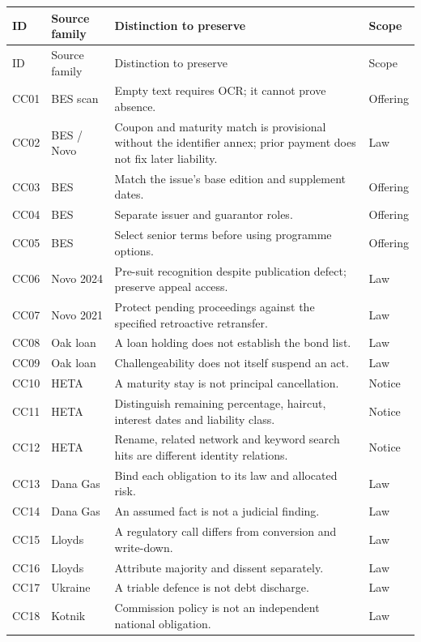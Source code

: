 {\small
\begin{longtable}{P{0.07\textwidth}P{0.18\textwidth}P{0.50\textwidth}P{0.10\textwidth}}
\toprule
ID & Source family & Distinction to preserve & Scope \\
\midrule
\endfirsthead
\toprule
ID & Source family & Distinction to preserve & Scope \\
\midrule
\endhead
CC01 & BES scan & Empty text requires OCR; it cannot prove absence. & Offering \\
CC02 & BES / Novo & Coupon and maturity match is provisional without the identifier annex; prior payment does not fix later liability. & Law \\
CC03 & BES & Match the issue's base edition and supplement dates. & Offering \\
CC04 & BES & Separate issuer and guarantor roles. & Offering \\
CC05 & BES & Select senior terms before using programme options. & Offering \\
CC06 & Novo 2024 & Pre-suit recognition despite publication defect; preserve appeal access. & Law \\
CC07 & Novo 2021 & Protect pending proceedings against the specified retroactive retransfer. & Law \\
CC08 & Oak loan & A loan holding does not establish the bond list. & Law \\
CC09 & Oak loan & Challengeability does not itself suspend an act. & Law \\
CC10 & HETA & A maturity stay is not principal cancellation. & Notice \\
CC11 & HETA & Distinguish remaining percentage, haircut, interest dates and liability class. & Notice \\
CC12 & HETA & Rename, related network and keyword search hits are different identity relations. & Notice \\
CC13 & Dana Gas & Bind each obligation to its law and allocated risk. & Law \\
CC14 & Dana Gas & An assumed fact is not a judicial finding. & Law \\
CC15 & Lloyds & A regulatory call differs from conversion and write-down. & Law \\
CC16 & Lloyds & Attribute majority and dissent separately. & Law \\
CC17 & Ukraine & A triable defence is not debt discharge. & Law \\
CC18 & Kotnik & Commission policy is not an independent national obligation. & Law \\

\end{longtable}}
